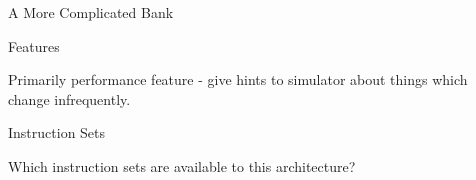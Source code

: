 \begin{frame}{A More Complicated Bank}

\centering
{}

\end{frame}

\begin{frame}{Features}

Primarily performance feature - give hints to simulator about things 
which change infrequently.

\end{frame}

\begin{frame}{Instruction Sets}

Which instruction sets are available to this architecture?

\end{frame}
